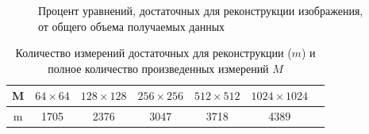 \documentclass[14pt]{matmex-diploma}
\begin{document}
\begin{figure}[h]
\centering
    \caption{Процент уравнений, достаточных для реконструкции изображения, от общего объема получаемых данных}
    \label{fig:percents_est}
\end{figure}


\begin{table}[h]
\centering
\begin{tabular}{| c | c | c | c | c | c | c |}
    \hline
    M & $64\times 64$ & $128\times 128$ & $256\times 256$ & $512\times 512$ & $1024\times 1024$  \\
    \hline
    m & 1705 & 2376 & 3047 & 3718 & 4389 \\
    \hline
\end{tabular}
\caption{Количество измерений достаточных для реконструкции ($m$) и полное количество произведенных измерений $M$}
\label{table:m_computed}
\end{table}
\end{document}
